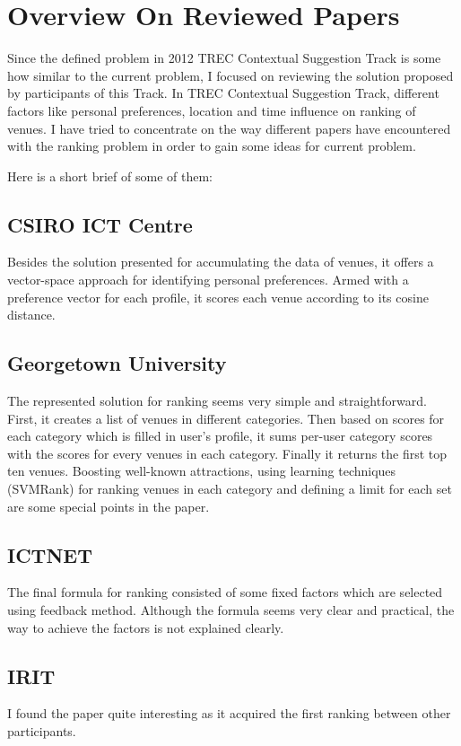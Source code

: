 \section{Overview On Reviewed Papers}
Since the defined problem in 2012 TREC Contextual Suggestion Track is some how similar to the current problem, I focused on reviewing the solution proposed by participants of this Track. In TREC Contextual Suggestion Track, different factors like personal preferences, location and time influence on ranking of venues. I have tried to concentrate on the way different papers have encountered with the ranking problem in order to gain some ideas for current problem.

Here is a short brief of some of them:

\subsection{CSIRO ICT Centre \cite{CSIRO}} 
Besides the solution presented for accumulating the data of venues, it offers a vector-space approach for identifying personal preferences. Armed with a preference vector for each profile, it scores each venue according to its cosine distance.


\subsection{Georgetown University \cite{GeorgetownUniversity}}
The represented solution for ranking seems very simple and straightforward. First, it creates a list of venues in different categories. Then based on scores for each category which is filled in user's profile, it sums per-user category scores with the scores for every venues in each category. Finally it returns the first top ten venues. Boosting well-known attractions, using learning techniques (SVMRank) for ranking venues in each category and defining a limit for each set are some special points in the paper.

\subsection{ICTNET \cite{ICTNET}}
The final formula for ranking consisted of some fixed factors which are selected using feedback method. Although the formula seems very clear and practical, the way to achieve the factors is not explained clearly.


\subsection{IRIT \cite{IRIT}}
I found the paper quite interesting as it acquired the first ranking between other participants. 
